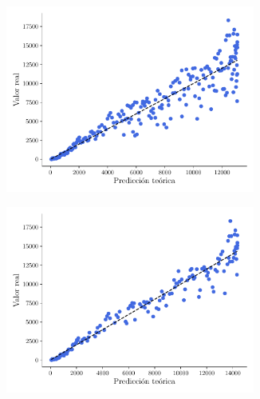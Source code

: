 \documentclass[twocolumn,aps,prl]{revtex4-1}
\begin{document}
\begin{figure}[ht!]
  \begin{subfigure}[b]{0.49\linewidth}
      \centering
      \includegraphics[width = 0.9\textwidth]{figuras/ex02-qq.pdf}
      \caption{}
      \label{fig:figuras/ex02-qq}
  \end{subfigure}\quad
  \begin{subfigure}[b]{0.49\linewidth}
      \centering
      \includegraphics[width = 0.9\textwidth]{figuras/ex02-qq-sin-Finde.pdf}
      \caption{}
      \label{fig:figuras/ex02-qq-sin-Finde}
  \end{subfigure}\quad


\end{figure}
\end{document}

